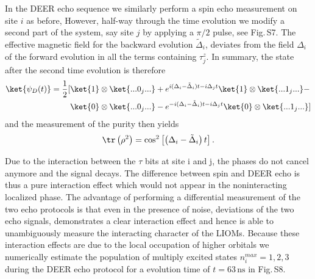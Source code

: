 In the DEER echo sequence we similarly perform a spin echo measurement on site $i$ as before, However, half-way through the time evolution we modify a second part of the system, say site $j$ by applying a $\pi/2$ pulse, see
Fig.\,S7. The effective magnetic field for the backward evolution $\tilde \Delta_i$, deviates from the field $\Delta_i$ of the forward evolution in all the terms containing $\tau_j^z$.
In summary, the state after the second time evolution is therefore
\begin{equation}
\begin{aligned}
\ket{\psi_{D}(t)} = \frac{1}{2} [& \ket{1}\otimes\ket{...0_j...} + e^{i (\Delta_i-\tilde{\Delta}_i) t - i\Delta_j t} \ket{1}\otimes \ket{...1_j...} - \\
&\ket{0}\otimes\ket{...0_j...}- e^{-i (\Delta_i-\tilde{\Delta}_i) t - i \Delta_j t} \ket{0}\otimes \ket{...1_j...}
]
\label{eq:deer_finaltime}
\end{aligned}
\end{equation}
and the measurement of the purity then yields
\begin{equation}
\tr \left(\rho^2\right) = \cos^2\left[\left(\Delta_i-\tilde{\Delta}_i\right) t\right].
\end{equation}

Due to the interaction between the $\tau$ bits at site i and j, the phases do not cancel anymore and the signal decays. The difference between spin and DEER echo is thus a pure interaction effect which would not appear in the noninteracting localized phase. The advantage of performing a differential measurement of the two echo protocols is that even in the presence of noise, deviations of the two echo signals, demonstrates a clear interaction effect and hence is able to unambiguously measure the interacting character of the LIOMs.
Because these interaction effects are due to the local occupation of higher orbitals we numerically estimate the population of multiply excited states $n_i^{max} = 1,2,3$ during the DEER echo protocol for a evolution time of $t = 63 \, \text{ns}$ in Fig.\,S8.

